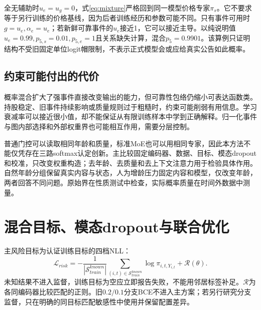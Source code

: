 全无辅助时$u_e=u_g=0$，式\eqref{eq:mixture}严格回到同一模型价格专家$\pi_s$。它不要求等于另行训练的价格基线，因为后者训练经历和参数可能不同。只有事件可用时$g=u_e,\alpha_e=u_e$；若新鲜可靠事件的$u_e$接近1，它可以接近主导。以纯说明值$u_e=0.99,p_{5,s}=0.01,p_{5,e}=1$且关系缺失计算，混合$p_5=0.9901$。该算例只证明结构不受旧固定单位logit帽限制，不表示正式模型会或应给真实公告如此概率。



\subsection{约束可能付出的代价}
概率混合扩大了强事件直接改变输出的能力，但可靠性包络仍缩小可表达函数类。持股稳定、旧事件持续影响或质量规则过于粗糙时，约束可能削弱有用信息。学习衰减率可以接近很小值，却不能保证从有限训练样本中学到正确解释。归一化事件与图内部选择和外部权重界也可能相互作用，需要分层控制。

普通门控可以读取相同年龄和质量，标准MoE也可以用相同专家，因此本方法不能仅凭存在三路softmax认定创新。主比较固定编码器、数据、目标、模态dropout和校准，只改变权重构造；去年龄、去质量和去上下文注意力用于检验具体作用。自然年龄分组保留真实内容与状态，人为增龄压力固定内容和模型，仅改变年龄，两者回答不同问题。原始界在性质测试中检查，实际概率质量在时间外数据中测量。

\section{混合目标、模态dropout与联合优化}
主风险目标为认证训练目标的四档NLL：
\begin{equation}
 \mathcal L_{risk}=-\frac1{|\mathcal S_{train}^{known}|}
 \sum_{(i,t)\in\mathcal S_{train}^{known}}\log\pi_{i,t,Y_{i,t}}+\mathcal R(\theta).
\end{equation}
未知结果不进入监督，训练目标为空应立即报告失败，不能用邻居标签补足。$\mathcal R$为各同编码器比较匹配的正则。旧$0.2/0.1$分支BCE不进入主方案；若另行研究分支监督，只在明确的同目标匹配敏感性中使用并保留配置差异。

